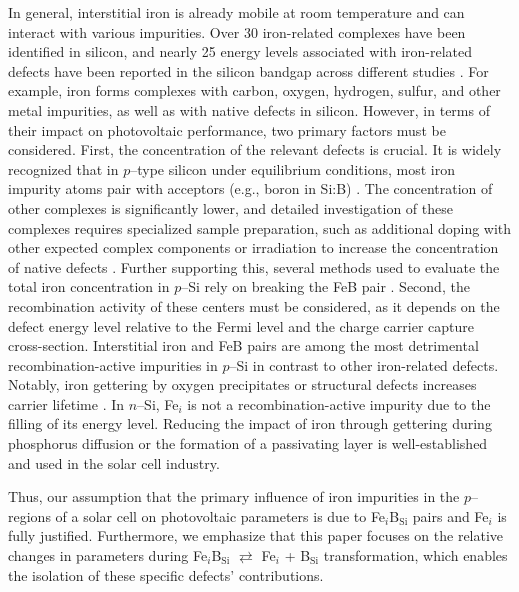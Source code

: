 \documentclass[a4paper,fleqn]{cas-sc}
\begin{document}
In general, interstitial iron is already mobile at room temperature and can interact with various impurities.
Over 30 iron-related complexes have been identified in silicon,
and nearly 25 energy levels associated with iron-related defects have been reported in the silicon bandgap across different studies \cite{Istratov1999,Gwozdz2022,JYOTHI2015}.
For example, iron forms complexes with carbon, oxygen, hydrogen, sulfur, and other metal impurities, as well as with native defects in silicon.
However, in terms of their impact on photovoltaic performance, two primary factors must be considered.
First, the concentration of the relevant defects is crucial.
It is widely recognized that in $p$--type silicon under equilibrium conditions, most iron impurity atoms pair with acceptors
(e.g., boron in Si:B) \cite{Kimerling1983,Istratov1999}.
The concentration of other complexes is significantly lower,
and detailed investigation of these complexes requires specialized sample preparation,
such as additional doping with other expected complex components
or irradiation to increase the concentration of native defects \cite{Tang2013}.
Further supporting this, several methods used to evaluate the total iron concentration in $p$--Si rely on breaking the FeB pair \cite{Zoth1990,FeMethod2012,Olikh2021JAP}.
Second, the recombination activity of these centers must be considered,
as it depends on the defect energy level relative to the Fermi level and the charge carrier capture cross-section.
Interstitial iron and FeB pairs are among the most detrimental recombination-active impurities in $p$--Si \cite{Istratov1999,TeimurazJAP} in contrast to other iron-related defects.
Notably, iron gettering by oxygen precipitates or structural defects increases carrier lifetime \cite{Schoen2011,FeB:Vahanissi}.
In $n$--Si, Fe$_i$ is not a recombination-active impurity due to the filling of its energy level.
Reducing the impact of iron through gettering during phosphorus diffusion \cite{Schoen2011,FeB:Vahanissi,Vaehaenissi2017} or the formation of a
passivating layer \cite{Teimuraz2014JAP} is well-established and used in the solar cell industry.

Thus, our assumption that the primary influence of iron impurities in the $p$--regions of a solar cell on photovoltaic parameters is due to
Fe$_i$B$_\mathrm{Si}$ pairs and Fe$_i$ is fully justified.
Furthermore, we emphasize that this paper focuses on the relative changes in parameters during
Fe$_i$B$_\mathrm{Si}$ $\rightleftarrows$ Fe$_i$ + B$_\mathrm{Si}$ transformation, which enables the isolation of these specific defects' contributions.
\end{document}
